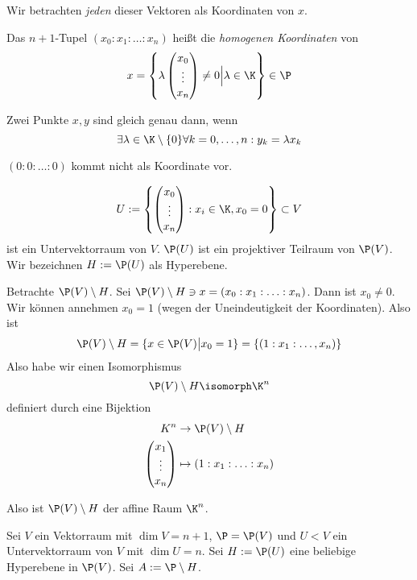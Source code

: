 \documentclass[a4paper, 10pt]{scrbook}
\begin{document}
Wir betrachten \emph{jeden} dieser Vektoren als Koordinaten von $x$.

\begin{df}
	\label{df:15.5}
	Das $n+1$-Tupel $(x_0:x_1:\dotsc: x_n)$ heißt die \emph{homogenen Koordinaten} von
	\[
		x = \left\{ \lambda \begin{pmatrix}x_0\\\vdots \\ x_n\end{pmatrix}\neq 0 \Big| \lambda \in \K\right\} \in \P
	\]

	Zwei Punkte $x,y$ sind gleich genau dann, wenn
	\[
		\exists \lambda\in \K\setminus\{0\} \forall k=0,\dotsc,n : y_k = \lambda x_k
	\]
	\begin{note}
		$(0:0:\dotsc:0)$ kommt nicht als Koordinate vor.
	\end{note}
\end{df}

\[
U := \left\{ \begin{pmatrix}x_0\\\vdots\\x_n\end{pmatrix}: x_i \in\K, x_0=0\right\} \subset V
\]
ist ein Untervektorraum von $V$.
$\P(U)$ ist ein projektiver Teilraum von $\P(V)$.
Wir bezeichnen $H:= \P(U)$ als Hyperebene.

Betrachte $\P(V) \setminus H$.
Sei $\P(V) \setminus H \ni x = (x_0:x_1:\dotsc:x_n)$.
Dann ist $x_0\neq 0$.
Wir können annehmen $x_0=1$ (wegen der Uneindeutigkeit der Koordinaten).
Also ist
\[
	\P(V) \setminus H = \{ x\in \P(V) \big| x_0 = 1\} = \{ (1:x_1:\dotsc, x_n) \}
\]
Also habe wir einen Isomorphismus
\[
	\P(V) \setminus H \isomorph \K^n
\]
definiert durch eine Bijektion
\begin{align*}
	K^n &\to \P(V) \setminus H\\
\begin{pmatrix}x_1\\\vdots\\ x_n\end{pmatrix} &\mapsto (1:x_1:\dotsc:x_n)
\end{align*}

Also ist $\P(V) \setminus H$ der affine Raum $\K^n$.
		

Sei $V$ ein Vektorraum mit $\dim V=n+1$, $\P = \P(V)$ und $U < V$ ein Untervektorraum von $V$ mit $\dim U =n$.
Sei $H := \P(U)$ eine beliebige Hyperebene in $\P(V)$.
Sei $A := \P \setminus H$.
\end{document}

